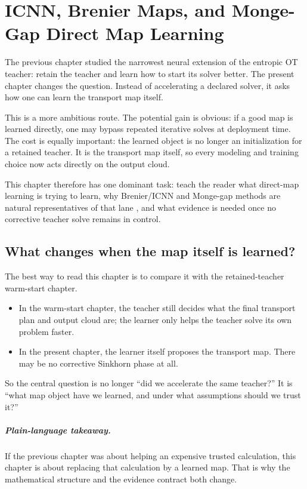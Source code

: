 \chapter{ICNN, Brenier Maps, and Monge-Gap Direct Map Learning}
\label{ch:bf-neural-ot-direct-map}

The previous chapter studied the narrowest neural extension of the entropic OT
teacher: retain the teacher and learn how to start its solver better.  The
present chapter changes the question.  Instead of accelerating a declared
solver, it asks how one can learn the transport map itself.

This is a more ambitious route.  The potential gain is obvious: if a good map is
learned directly, one may bypass repeated iterative solves at deployment time.
The cost is equally important: the learned object is no longer an initialization
for a retained teacher.  It is the transport map itself, so every modeling and
training choice now acts directly on the output cloud.

This chapter therefore has one dominant task: teach the reader what direct-map
learning is trying to learn, why Brenier/ICNN and Monge-gap methods are natural
representatives of that lane \citep{amos2017icnn,makkuva2020otmapping,uscidda2023mongegap}, and what evidence is needed once no corrective
teacher solve remains in control.

\section{What changes when the map itself is learned?}
\label{sec:bf-neural-ot-direct-orientation}

The best way to read this chapter is to compare it with the retained-teacher
warm-start chapter.
\begin{itemize}
  \item In the warm-start chapter, the teacher still decides what the final
  transport plan and output cloud are; the learner only helps the teacher solve
  its own problem faster.
  \item In the present chapter, the learner itself proposes the transport map.
  There may be no corrective Sinkhorn phase at all.
\end{itemize}
So the central question is no longer “did we accelerate the same teacher?”  It
is “what map object have we learned, and under what assumptions should we trust
it?”

\paragraph{Plain-language takeaway.}
If the previous chapter was about helping an expensive trusted calculation, this
chapter is about replacing that calculation by a learned map.  That is why the
mathematical structure and the evidence contract both change.

